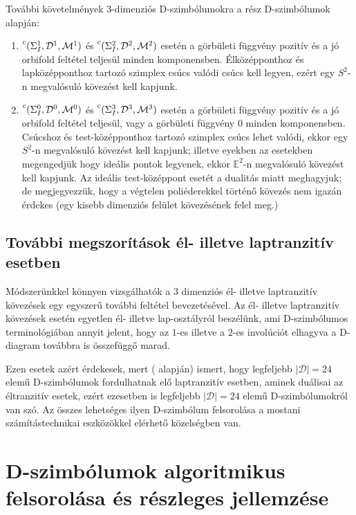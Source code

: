 \documentclass[12pt,magyar,a4paper]{article}
\newcommand{\leftexp}[2]{{\vphantom{#2}}^{#1}{#2}}
\begin{document}
További követelmények $3$-dimenziós D-szimbólumokra a rész D-szimbólumok alapján:
\begin{enumerate}                                                                                    
  \item $\leftexp{c}(\Sigma_I^1,\mathcal{D}^1,\mathcal{M}^1)$ és
    $\leftexp{c}(\Sigma_I^2,\mathcal{D}^2,\mathcal{M}^2)$ esetén a görbületi
    függvény pozitív és a jó orbifold feltétel teljesül minden komponensben.
    Élközépponthoz és lapközépponthoz tartozó szimplex csúcs valódi csúcs kell
    legyen, ezért egy $S^2$-n megvalósuló kövezést kell kapjunk.
  \item $\leftexp{c}(\Sigma_I^0,\mathcal{D}^0,\mathcal{M}^0)$ és
    $\leftexp{c}(\Sigma_I^3,\mathcal{D}^3,\mathcal{M}^3)$ esetén a görbületi függvény
    pozitív és a jó orbifold feltétel teljesül, vagy a görbületi függvény
    $0$ minden komponensben. Csúcshoz és test-középponthoz tartozó szimplex csúcs
    lehet valódi, ekkor egy $S^2$-n megvalósuló kövezést kell kapjunk; illetve
    eyekben az esetekben megengedjük hogy ideális pontok legyenek, ekkor
    $\mathbb{E}^2$-n megvalósuló kövezést kell kapjunk. Az ideális
    test-középpont esetét a dualitás miatt meghagyjuk; de megjegyezzük, hogy a
    végtelen poliéderekkel történő kövezés nem igazán érdekes (egy kisebb
    dimenziós felület kövezésének felel meg.)
\end{enumerate}

\subsection{További megszorítások él- illetve laptranzitív esetben}
Módszerünkkel könnyen vizsgálhatók a $3$ dimenziós él- illetve laptranzitív
kövezések egy egyszerű további feltétel bevezetésével. Az él- illetve
laptranzitív kövezések esetén egyetlen él- illetve lap-osztályról beszélünk, ami
D-szimbólumos terminológiában annyit jelent, hogy az $1$-es illetve a $2$-es
involúciót elhagyva a D-diagram továbbra is összefüggő marad.

Ezen esetek azért érdekesek, mert (\cite{aa} alapján) ismert, hogy legfeljebb
$|\mathcal{D}|=24$ elemű D-szimbólumok fordulhatnak elő laptranzitív esetben,
aminek duálisai az éltranzitív esetek, ezért ezesetben is legfeljebb
$|\mathcal{D}|=24$ elemű D-szimbólumokról van szó. Az összes lehetséges ilyen
D-szimbólum felsorolása a mostani számítástechnikai eszközökkel elérhető
közelségben van.

\section{D-szimbólumok algoritmikus felsorolása és részleges jellemzése}
\end{document}
